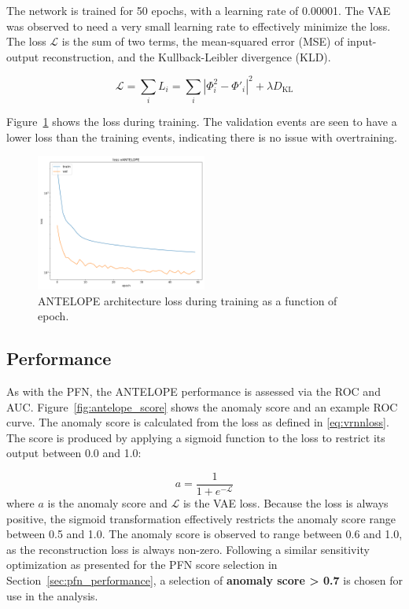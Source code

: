 The network is trained for 50 epochs, with a learning rate of 0.00001. 
The VAE was observed to need a very small learning rate to effectively minimize the loss.
The loss $\mathcal{L}$ is the sum of two terms, the mean-squared error (MSE) of input-output reconstruction, and the Kullback-Leibler divergence (KLD).

\begin{equation}
\label{eq:vrnnloss}
\mathcal{L} = \sum_i L_i = \sum_i | \Phi_i^2 - \Phi\prime_i |^2 + \lambda D_{\text{KL}}
\end{equation}

Figure~\ref{fig:antelope_loss} shows the loss during training.
The validation events are seen to have a lower loss than the training events, indicating there is no issue with overtraining.
\begin{figure}[!htbp]
\centering
   \includegraphics[width=0.5\textwidth]{figures/ml/antelope_loss}    
    \caption{ANTELOPE architecture loss during training as a function of epoch.
    \label{fig:antelope_loss}}
\end{figure}


\subsection{Performance}
\label{subsec:antelope_perf}

As with the PFN, the ANTELOPE performance is assessed via the ROC and AUC. 
Figure~\ref{fig:antelope_score} shows the anomaly score and an example ROC curve.
The anomaly score is calculated from the loss as defined in \ref{eq:vrnnloss}.
The score is produced by applying a sigmoid function to the loss to restrict its output between 0.0 and 1.0:

\begin{equation}
\label{eq:asfunc}
a = \frac{1}{1+e^{-\mathcal{L}}}
\end{equation}
where $a$ is the anomaly score and $\mathcal{L}$ is the VAE loss. Because the loss is always positive, the sigmoid transformation effectively restricts the anomaly score range between 0.5 and 1.0. The anomaly score is observed to range between 0.6 and 1.0, as the reconstruction loss is always non-zero. Following a similar sensitivity optimization as presented for the PFN score selection in Section~\ref{sec:pfn_performance}, a selection of \textbf{anomaly score > 0.7} is chosen for use in the analysis.

